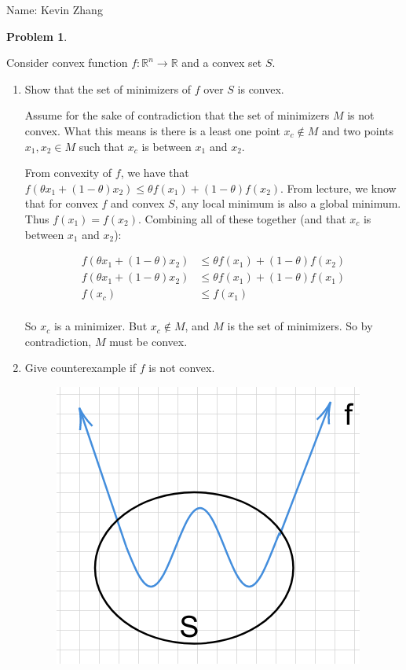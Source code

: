 \documentclass[11pt]{article}
\newcommand{\yourname}{Kevin Zhang}
\newcommand{\R}{\mathbb{R}}
\theoremstyle{definition}
\theoremstyle{case}
\theoremstyle{theorem}
\newtheorem{prob}{Problem}
\begin{document}
{\large
\noindent Name: \yourname}

\vspace{15pt}

\begin{prob}
\end{prob}

Consider convex function $f : \R^n \longrightarrow \R$ and a convex set $S$.

\begin{enumerate}[label=(\alph*)]

\item Show that the set of minimizers of $f$ over $S$ is convex. 

Assume for the sake of contradiction that the set of minimizers $M$ is not convex. 
What this means is there is a least one point $x_c \notin M$ and two points $x_1, x_2 \in M$ 
such that $x_c$ is between $x_1$ and $x_2$. 

From convexity of $f$, we have that $f(\theta x_1 + (1 - \theta) x_2) \leq \theta f(x_1) + (1 - \theta) f(x_2)$. 
From lecture, we know that for convex $f$ and convex $S$, any local minimum is also a global minimum. Thus $f(x_1) = f(x_2)$.
Combining all of these together (and that $x_c$ is between $x_1$ and $x_2$):

\begin{align*}
f(\theta x_1 + (1 - \theta) x_2) &\leq \theta f(x_1) + (1 - \theta) f(x_2) \\
f(\theta x_1 + (1 - \theta) x_2) &\leq \theta f(x_1) + (1 - \theta) f(x_1) \\
f(x_c) &\leq f(x_1) \\
\end{align*}

So $x_c$ is a minimizer. But $x_c \notin M$, and $M$ is the set of minimizers. So by contradiction, $M$ must be convex.

\item Give counterexample if $f$ is not convex.

\begin{figure}[h!]
  \centering
  \includegraphics[totalheight=3cm]{images/f-not-convex.png}
\end{figure}


\end{enumerate}
\end{document}
